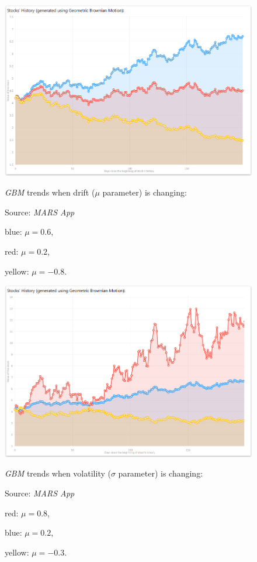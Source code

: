         \begin{figure}[H]
            \centering
            \includegraphics[width=\textwidth]{img/gbm_dri_06_02andm08.png}
            \caption{\textit{GBM} trends when drift ($\mu$ parameter) is changing:}
            \caption*{Source: \textit{MARS App}}
            \caption*{blue: $\mu = 0.6$,}
            \caption*{red: $\mu = 0.2$,}
            \caption*{yellow: $\mu = -0.8$.}
            \label{fig:gbm_dri}
        \end{figure}
        
        \begin{figure}[H]
            \centering
            \includegraphics[width=\textwidth]{img/gbm_vol_08_02andm03.png}
            \caption{\textit{GBM} trends when volatility ($\sigma$ parameter) is changing:}
            \caption*{Source: \textit{MARS App}}
            \caption*{red: $\mu = 0.8$,}
            \caption*{blue: $\mu = 0.2$,}
            \caption*{yellow: $\mu = -0.3$.}
            \label{fig:gbm_vol}
        \end{figure}
    
